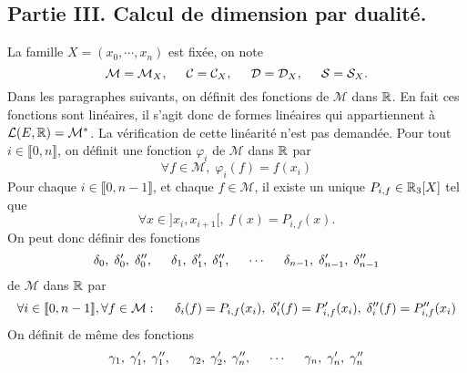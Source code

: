 \subsection*{Partie III. Calcul de dimension par dualité.}
La famille $X=(x_0,\cdots,x_n)$ est fixée, on note 
\begin{displaymath}
\mathcal{M}=\mathcal{M}_X,\hspace{0.5cm} \mathcal{C}=\mathcal{C}_X,\hspace{0.5cm} \mathcal{D}=\mathcal{D}_X,\hspace{0.5cm} \mathcal{S}=\mathcal{S}_X.  
\end{displaymath}
Dans les paragraphes  suivants, on définit  des fonctions de $\mathcal{M}$ dans $\mathbb{R}$. En fait ces fonctions sont linéaires, il s'agit donc de formes linéaires qui appartiennent à $\mathcal{L}(E,\mathbb{R}) = \mathcal{M}^*$. La vérification de cette linéarité n'est pas demandée.\newline
Pour tout $i\in \llbracket 0,n \rrbracket$, on définit une fonction $\varphi_i$ de $\mathcal{M}$ dans $\mathbb{R}$ par 
\begin{displaymath}
  \forall f\in \mathcal{M}, \; \varphi_i(f) = f(x_i)
\end{displaymath}
Pour chaque $i\in \llbracket 0,n-1 \rrbracket$, et chaque $f\in \mathcal{M}$, il existe un unique $P_{i,f}\in \mathbb{R}_3[X]$ tel que 
\begin{displaymath}
  \forall x\in ]x_i,x_{i+1}[, \; f(x) = P_{i,f}(x).
\end{displaymath}
On peut donc définir des fonctions
\begin{displaymath}
  \delta_0,\; \delta'_0,\; \delta''_0,\hspace{0.5cm} \delta_1,\; \delta'_1,\; \delta''_1,
  \hspace{0.5cm}\cdots \hspace{0.5cm}
  \delta_{n-1},\; \delta'_{n-1},\; \delta''_{n-1}
\end{displaymath}
de $\mathcal{M}$ dans $\mathbb{R}$ par 
\begin{displaymath}
  \forall i\in \llbracket 0,n-1 \rrbracket, \forall f\in \mathcal{M}: \hspace{0.5cm}
\delta_i(f) = P_{i,f}(x_i), \; \delta'_i(f) = P_{i,f}'(x_i), \; \delta''_i(f) = P_{i,f}''(x_i)
\end{displaymath}
On définit de même des fonctions
\begin{displaymath}
  \gamma_1,\; \gamma'_1,\; \gamma''_1,\hspace{0.5cm} \gamma_2,\; \gamma'_2,\; \gamma''_n,
  \hspace{0.5cm}\cdots \hspace{0.5cm}
  \gamma_{n},\; \gamma'_{n},\; \gamma''_{n}
\end{displaymath}
